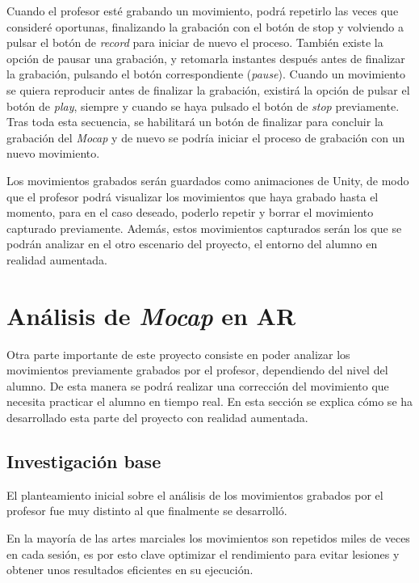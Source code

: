 Cuando el profesor esté grabando un movimiento, podrá repetirlo las veces que consideré oportunas, finalizando la grabación con el botón de stop y volviendo a pulsar el botón de \textit{record} para iniciar de nuevo el proceso. También existe la opción de pausar una grabación, y retomarla instantes después antes de finalizar la grabación, pulsando el botón correspondiente (\textit{pause}). Cuando un movimiento se quiera reproducir antes de finalizar la grabación, existirá la opción de pulsar el botón de \textit{play}, siempre y cuando se haya pulsado el botón de \textit{stop} previamente. Tras toda esta secuencia, se habilitará un botón de finalizar para concluir la grabación del \textit{Mocap} y de nuevo se podría iniciar el proceso de grabación con un nuevo movimiento.

Los movimientos grabados serán guardados como animaciones de Unity, de modo que el profesor podrá visualizar los movimientos que haya grabado hasta el momento, para en el caso deseado, poderlo repetir y borrar el movimiento capturado previamente. Además, estos movimientos capturados serán los que se podrán analizar en el otro escenario del proyecto, el entorno del alumno en realidad aumentada.

\section{Análisis de \textit{Mocap} en AR}

Otra parte importante de este proyecto consiste en poder analizar los movimientos previamente grabados por el profesor, dependiendo del nivel del alumno. De esta manera se podrá realizar una corrección del movimiento que necesita practicar el alumno en tiempo real. En esta sección se explica cómo se ha desarrollado esta parte del proyecto con realidad aumentada.

\subsection{Investigación base}
\label{cap5:sec:panteamientoOpenCV} 

El planteamiento inicial sobre el análisis de los movimientos grabados por el profesor fue muy distinto al que finalmente se desarrolló. 

En la mayoría de las artes marciales los movimientos son repetidos miles de veces en cada sesión, es por esto clave optimizar el rendimiento para evitar lesiones y obtener unos resultados eficientes en su ejecución.

